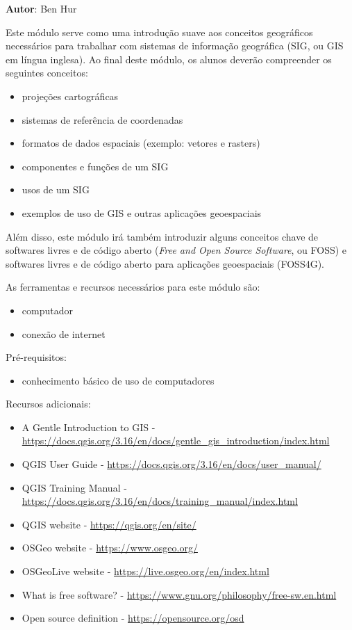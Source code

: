\documentclass[
]{krantz}
\providecommand{\tightlist}{%
  \setlength{\itemsep}{0pt}\setlength{\parskip}{0pt}}
\begin{document}
\textbf{Autor}: Ben Hur

Este módulo serve como uma introdução suave aos conceitos geográficos necessários para trabalhar com sistemas de informação geográfica (SIG, ou GIS em língua inglesa). Ao final deste módulo, os alunos deverão compreender os seguintes conceitos:

\begin{itemize}
\tightlist
\item
  projeções cartográficas
\item
  sistemas de referência de coordenadas
\item
  formatos de dados espaciais (exemplo: vetores e rasters)
\item
  componentes e funções de um SIG
\item
  usos de um SIG
\item
  exemplos de uso de GIS e outras aplicações geoespaciais
\end{itemize}

Além disso, este módulo irá também introduzir alguns conceitos chave de softwares livres e de código aberto (\emph{Free and Open Source Software}, ou FOSS) e softwares livres e de código aberto para aplicações geoespaciais (FOSS4G).

As ferramentas e recursos necessários para este módulo são:

\begin{itemize}
\tightlist
\item
  computador
\item
  conexão de internet
\end{itemize}

Pré-requisitos:

\begin{itemize}
\tightlist
\item
  conhecimento básico de uso de computadores
\end{itemize}

Recursos adicionais:

\begin{itemize}
\tightlist
\item
  A Gentle Introduction to GIS - \url{https://docs.qgis.org/3.16/en/docs/gentle_gis_introduction/index.html}
\item
  QGIS User Guide - \url{https://docs.qgis.org/3.16/en/docs/user_manual/}
\item
  QGIS Training Manual - \url{https://docs.qgis.org/3.16/en/docs/training_manual/index.html}
\item
  QGIS website - \url{https://qgis.org/en/site/}
\item
  OSGeo website - \url{https://www.osgeo.org/}
\item
  OSGeoLive website - \url{https://live.osgeo.org/en/index.html}
\item
  What is free software? - \url{https://www.gnu.org/philosophy/free-sw.en.html}
\item
  Open source definition - \url{https://opensource.org/osd}
\end{itemize}
\end{document}
